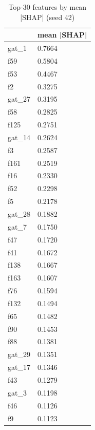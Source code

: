 \begin{table}
\caption{Top-30 features by mean |SHAP| (seed 42)}
\label{tab:02_shap_top30}
\begin{tabular}{ll}
\toprule
 & mean |SHAP| \\
\midrule
gat\_1 & 0.7664 \\
f59 & 0.5804 \\
f53 & 0.4467 \\
f2 & 0.3275 \\
gat\_27 & 0.3195 \\
f58 & 0.2825 \\
f125 & 0.2751 \\
gat\_14 & 0.2624 \\
f3 & 0.2587 \\
f161 & 0.2519 \\
f16 & 0.2330 \\
f52 & 0.2298 \\
f5 & 0.2178 \\
gat\_28 & 0.1882 \\
gat\_7 & 0.1750 \\
f47 & 0.1720 \\
f41 & 0.1672 \\
f138 & 0.1667 \\
f163 & 0.1607 \\
f76 & 0.1594 \\
f132 & 0.1494 \\
f65 & 0.1482 \\
f90 & 0.1453 \\
f88 & 0.1381 \\
gat\_29 & 0.1351 \\
gat\_17 & 0.1346 \\
f43 & 0.1279 \\
gat\_3 & 0.1198 \\
f46 & 0.1126 \\
f9 & 0.1123 \\
\bottomrule
\end{tabular}
\end{table}
